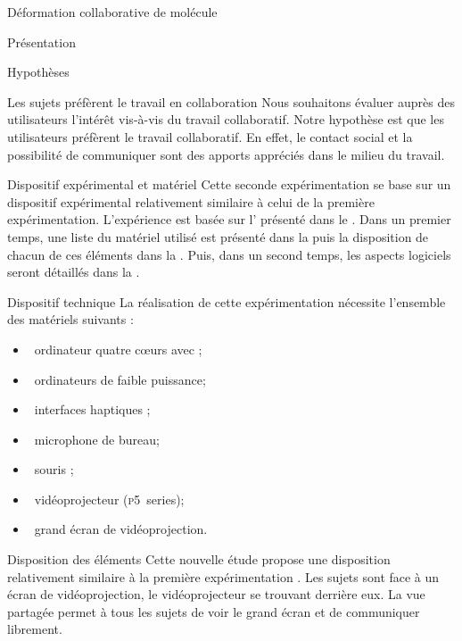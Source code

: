 \documentclass[myfrancais]{mythesis}
\begin{document}
\begin{mychapter}{Déformation collaborative de molécule}
\begin{mysection}{Présentation}
\begin{mysubsection}{Hypothèses}
\begin{myparagraph}{ Les sujets préfèrent le travail en collaboration}
					Nous souhaitons évaluer auprès des utilisateurs l'intérêt vis-à-vis du travail collaboratif.
					Notre hypothèse est que les utilisateurs préfèrent le travail collaboratif.
					En effet, le contact social et la possibilité de communiquer sont des apports appréciés dans le milieu du travail.
				\end{myparagraph}
			\end{mysubsection}
		\end{mysection}
		\begin{mysection}{Dispositif expérimental et matériel}
			Cette seconde expérimentation se base sur un dispositif expérimental relativement similaire à celui de la première expérimentation.
			L'expérience est basée sur l' présenté dans le .
			Dans un premier temps, une liste du matériel utilisé est présenté dans la  puis la disposition de chacun de ces éléments dans la .
			Puis, dans un second temps, les aspects logiciels seront détaillés dans la .
			\begin{mysubsection}{Dispositif technique}
				La réalisation de cette expérimentation nécessite l'ensemble des matériels suivants :
				\begin{itemize}
					\item {}~ordinateur quatre cœurs \myIntelCore avec ;
					\item {}~ordinateurs de faible puissance;
					\item {}~interfaces haptiques \myOmni;
					\item {}~microphone de bureau;
					\item {}~souris \myThreeD \mySpaceNavigator;
					\item {}~vidéoprojecteur \myACER (\textsc{p5}~series);
					\item {}~grand écran de vidéoprojection.
				\end{itemize}
			\end{mysubsection}
			\begin{mysubsection}{Disposition des éléments}
				Cette nouvelle étude propose une disposition relativement similaire à la première expérimentation .
				Les sujets sont face à un écran de vidéoprojection, le vidéoprojecteur se trouvant derrière eux.
				La vue partagée permet à tous les sujets de voir le grand écran et de communiquer librement.


\end{mysubsection}
\end{mysection}
\end{mychapter}
\end{document}
